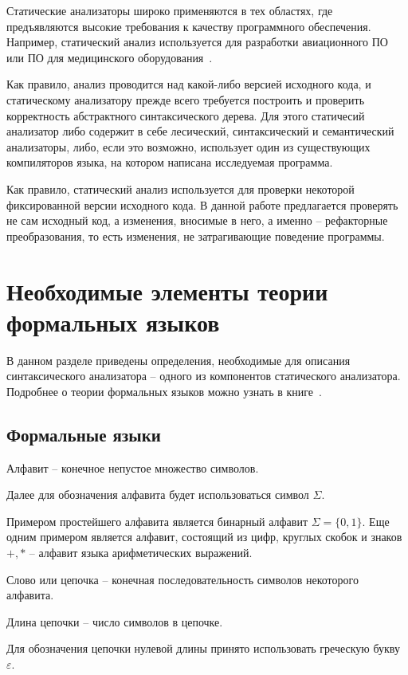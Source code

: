 Статические анализаторы широко применяются в тех областях, где предъявляются высокие требования к качеству программного обеспечения.
Например, статический анализ используется для разработки авиационного ПО~\cite{static-air} или ПО для медицинского оборудования~\cite{static-med}.


Как правило, анализ проводится над какой-либо версией исходного кода,
и статическому анализатору прежде всего требуется построить и проверить корректность абстрактного синтаксического дерева.
Для этого статичесий анализатор либо содержит в себе лесический, синтаксический и семантический анализаторы,
либо, если это возможно, использует один из существующих компиляторов языка, на котором написана исследуемая программа.

Как правило, статический анализ используется для проверки некоторой фиксированной версии исходного кода.
В данной работе предлагается проверять не сам исходный код, а изменения, вносимые в него,
а именно -- рефакторные преобразования, то есть изменения, не затрагивающие поведение программы.
\section{Необходимые элементы теории формальных языков}
В данном разделе приведены определения, необходимые для описания синтаксического анализатора -- одного из компонентов статического анализатора.
Подробнее о теории формальных языков можно узнать в книге~\cite{hmu}.
\subsection{Формальные языки}
\begin{definition}
Алфавит -- конечное непустое множество символов.
\end{definition}
Далее для обозначения алфавита будет использоваться символ $\Sigma$.

Примером простейшего алфавита является бинарный алфавит $\Sigma = \{0, 1\}$.
Еще одним примером является алфавит, состоящий из цифр, круглых скобок и знаков $+, *$ -- алфавит языка арифметических выражений.
\begin{definition}
Слово или цепочка -- конечная последовательность символов некоторого алфавита.
\end{definition}
\begin{definition}
Длина цепочки -- число символов в цепочке.
\end{definition}
Для обозначения цепочки нулевой длины принято использовать греческую букву $\varepsilon$.


